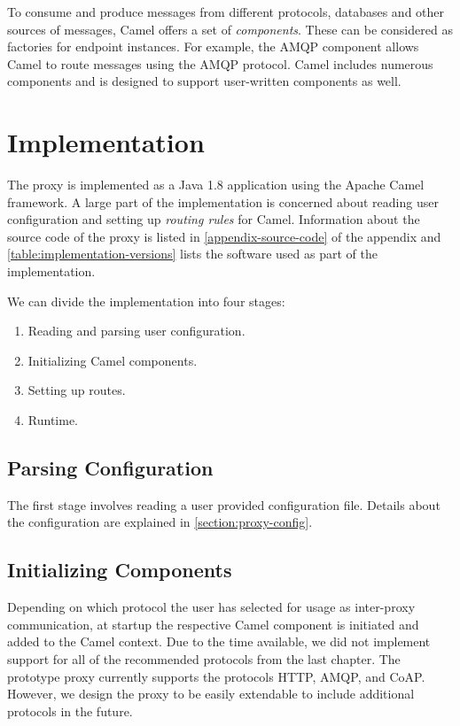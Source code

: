 To consume and produce messages from different protocols, databases and other
sources of messages, Camel offers a set of \textit{components}. These can be
considered as factories for endpoint instances. For example, the AMQP component
allows Camel to route messages using the AMQP protocol. Camel includes numerous
components and is designed to support user-written components as well.


\section{Implementation}

The proxy is implemented as a Java 1.8 application using the Apache Camel
framework. A large part of the implementation is concerned about reading user
configuration and setting up \textit{routing rules} for Camel. Information about
the source code of the proxy is listed in \cref{appendix-source-code} of the
appendix and \cref{table:implementation-versions} lists the software used as
part of the implementation.

We can divide the implementation into four stages:

\begin{enumerate}
    \item Reading and parsing user configuration.
    \item Initializing Camel components.
    \item Setting up routes.
    \item Runtime.
\end{enumerate}

\subsection{Parsing Configuration}

The first stage involves reading a user provided configuration file. Details
about the configuration are explained in \cref{section:proxy-config}.

\subsection{Initializing Components}

Depending on which protocol the user has selected for usage as inter-proxy
communication, at startup the respective Camel component is initiated and added
to the Camel context. Due to the time available, we did not implement support
for all of the recommended protocols from the last chapter. The prototype proxy
currently supports the protocols HTTP, AMQP, and CoAP. However, we design the
proxy to be easily extendable to include additional protocols in the future.

